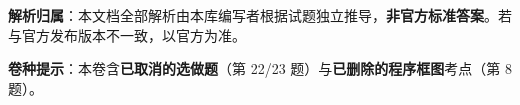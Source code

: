 

\begin{gknotice}
\textbf{解析归属}：本文档全部解析由本库编写者根据试题独立推导，\textbf{非官方标准答案}。若与官方发布版本不一致，以官方为准。

\textbf{ 卷种提示}：本卷含\textbf{已取消的选做题}（第 22/23 题）与\textbf{已删除的程序框图}考点（第 8 题）。
\end{gknotice}

\par\medskip



